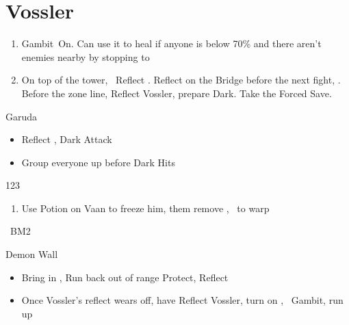 \chapter{Vossler}

\begin{enumerate}
	\item Gambit\ashe\ On. Can use it to heal if anyone is below 70\% and there aren't enemies nearby by stopping to \flee
	\item On top of the tower, \vaan\ Reflect \vaan. Reflect on the Bridge before the next fight, \leader{\penelo}. Before the zone line, Reflect Vossler, prepare Dark. Take the Forced Save.
\end{enumerate}
\begin{battle}{Garuda}
	\begin{itemize}
		\item Reflect \penelo, \ashe
		      \penelof Dark \ashe
		      \ashef Attack \penelo
		\item Group everyone up before Dark Hits
	\end{itemize}
\end{battle}
\begin{shop}{123}
\end{shop}
\begin{enumerate}
	\item Use Potion on Vaan to freeze him, them remove \ashe, \penelo\ to warp
\end{enumerate}
\begin{liscense}
	\ashe\ BM2
\end{liscense}
\begin{gambit}
	\begin{itemize}
	\end{itemize}
\end{gambit}
\begin{battle}{Demon Wall}
	\begin{itemize}
		\item Bring in \ashe, \penelo
		      \vaanf Run back out of range
		      \vaanf Protect, Reflect \vaan
		\item Once Vossler's reflect wears off, have \vaan Reflect Vossler, turn on \ashe, \penelo\ Gambit, run up
	\end{itemize}
\end{battle}
